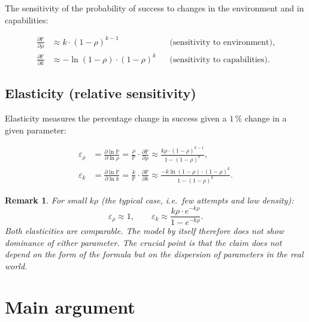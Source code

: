 \documentclass[12pt,a4paper]{article}
\newtheorem{remark}{Remark}[section]
\begin{document}
The sensitivity of the probability of success to changes in the environment and in capabilities:

\begin{align}
    \frac{\partial \mathbb{P}}{\partial \rho} &\approx k \cdot (1-\rho)^{k-1} & &\text{(sensitivity to environment),} \label{eq:dP_drho} \\[6pt]
    \frac{\partial \mathbb{P}}{\partial k} &\approx -\ln(1-\rho) \cdot (1-\rho)^k & &\text{(sensitivity to capabilities).} \label{eq:dP_dk}
\end{align}

\subsection{Elasticity (relative sensitivity)}

Elasticity measures the percentage change in success given a $1\,\%$ change in a given parameter:

\begin{align}
    \varepsilon_\rho &= \frac{\partial \ln \mathbb{P}}{\partial \ln \rho} = \frac{\rho}{\mathbb{P}} \cdot \frac{\partial \mathbb{P}}{\partial \rho} \approx \frac{k\rho \cdot (1-\rho)^{k-1}}{1-(1-\rho)^k}, \label{eq:elast_rho} \\[6pt]
    \varepsilon_k &= \frac{\partial \ln \mathbb{P}}{\partial \ln k} = \frac{k}{\mathbb{P}} \cdot \frac{\partial \mathbb{P}}{\partial k} \approx \frac{-k\ln(1-\rho) \cdot (1-\rho)^k}{1-(1-\rho)^k}. \label{eq:elast_k}
\end{align}

\begin{remark}
For small $k\rho$ (the typical case, i.e.\ few attempts and low density):
\begin{equation}
    \varepsilon_\rho \approx 1, \qquad \varepsilon_k \approx \frac{k\rho \cdot e^{-k\rho}}{1 - e^{-k\rho}}.
\end{equation}
Both elasticities are comparable. The model by itself therefore does not show dominance of either parameter. The crucial point is that the claim does not depend on the form of the formula but on the \emph{dispersion of parameters in the real world}.
\end{remark}

\section{Main argument}
\end{document}
